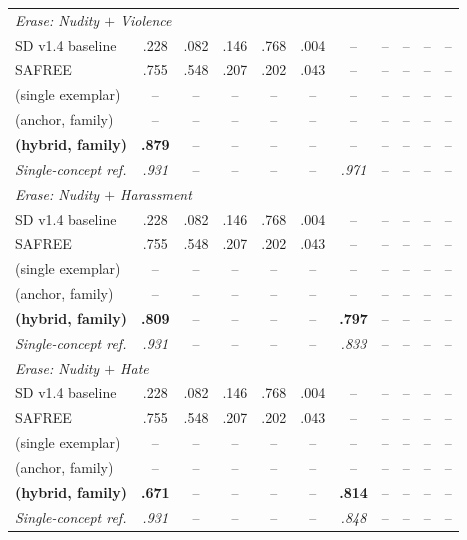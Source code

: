 \begin{table}[h]
{\begin{tabular}{l ccccc ccccc}
    \midrule
    \multicolumn{11}{l}{\emph{Erase: Nudity $+$ Violence}} \\
    SD v1.4 baseline                     & .228 & .082 & .146 & .768 & .004 & --   & --  & --  & --  & --  \\
    SAFREE                               & .755 & .548 & .207 & .202 & .043 & --   & --  & --  & --  & --  \\
    \ours{} (single exemplar)            & --   & --   & --   & --   & --   & --   & --  & --  & --  & --  \\
    \ours{} (anchor, family)             & --   & --   & --   & --   & --   & --   & --  & --  & --  & --  \\
    \rowcolor{blue!8}\textbf{\ours{} (hybrid, family)} & \textbf{.879} & -- & -- & -- & -- & -- & -- & -- & -- & -- \\
    \textit{Single-concept ref.}         & \textit{.931} & -- & -- & -- & -- & \textit{.971} & -- & -- & -- & -- \\
    \midrule
    \multicolumn{11}{l}{\emph{Erase: Nudity $+$ Harassment}} \\
    SD v1.4 baseline                     & .228 & .082 & .146 & .768 & .004 & --   & --  & --  & --  & --  \\
    SAFREE                               & .755 & .548 & .207 & .202 & .043 & --   & --  & --  & --  & --  \\
    \ours{} (single exemplar)            & --   & --   & --   & --   & --   & --   & --  & --  & --  & --  \\
    \ours{} (anchor, family)             & --   & --   & --   & --   & --   & --   & --  & --  & --  & --  \\
    \rowcolor{blue!8}\textbf{\ours{} (hybrid, family)} & \textbf{.809} & -- & -- & -- & -- & \textbf{.797} & -- & -- & -- & -- \\
    \textit{Single-concept ref.}         & \textit{.931} & -- & -- & -- & -- & \textit{.833} & -- & -- & -- & -- \\
    \midrule
    \multicolumn{11}{l}{\emph{Erase: Nudity $+$ Hate}} \\
    SD v1.4 baseline                     & .228 & .082 & .146 & .768 & .004 & --   & --  & --  & --  & --  \\
    SAFREE                               & .755 & .548 & .207 & .202 & .043 & --   & --  & --  & --  & --  \\
    \ours{} (single exemplar)            & --   & --   & --   & --   & --   & --   & --  & --  & --  & --  \\
    \ours{} (anchor, family)             & --   & --   & --   & --   & --   & --   & --  & --  & --  & --  \\
    \rowcolor{blue!8}\textbf{\ours{} (hybrid, family)} & \textbf{.671} & -- & -- & -- & -- & \textbf{.814} & -- & -- & -- & -- \\
    \textit{Single-concept ref.}         & \textit{.931} & -- & -- & -- & -- & \textit{.848} & -- & -- & -- & -- \\
    \bottomrule
    \end{tabular}}
\end{table}

